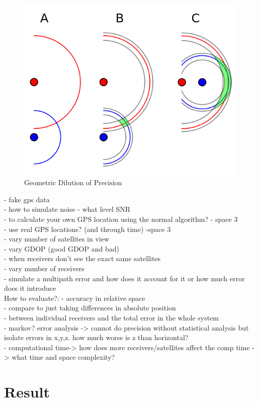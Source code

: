 \documentclass[11pt,a4paper]{article}
\begin{document}
\begin{figure}
\centering
\caption{Geometric Dilution of Precision}
\label{Fig: GDOP abstract}
\includegraphics[width=0.7\linewidth]{GDOP.png}
\end{figure}




- fake gps data\\
- how to simulate noise - what level SNR\\
- to calculate your own GPS location using the normal algorithm? - space 3 \\
- use real GPS locations? (and through time) -space 3\\
- vary number of satellites in view\\
- vary GDOP (good GDOP and bad)\\
- when receivers don't see the exact same satellites \\
- vary number of receivers \\
- simulate a multipath error and how does it account for it or how much error does it introduce\\

How to evaluate?:
- accuracy in relative space\\
- compare to just taking differences in absolute position \\
- between individual receivers and the total error in the whole system\\
- markov? error analysis -> cannot do precision without statistical analysis but isolate errors in x,y,z. how much worse is z than horizontal?\\
- computational time-> how does more receivers/satellites affect the comp time -> what time and space complexity?


\section{Result}





\end{document}
